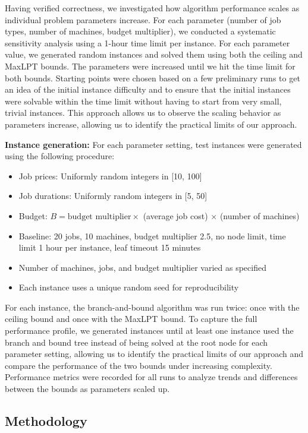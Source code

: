 Having verified correctness, we investigated how algorithm performance scales as individual problem parameters increase. 
For each parameter (number of job types, number of machines, budget multiplier), we conducted a systematic sensitivity analysis using a 1-hour time limit per instance. 
For each parameter value, we generated random instances and solved them using both the ceiling and MaxLPT bounds. The parameters were increased until we hit the time limit for both bounds.
Starting points were chosen based on a few preliminary runs to get an idea of the initial instance difficulty and to ensure that the initial instances were solvable within the time limit without having to start from very small, trivial instances. 
This approach allows us to observe the scaling behavior as parameters increase, allowing us to identify the practical limits of our approach.

\textbf{Instance generation:} For each parameter setting, test instances were generated using the following procedure:
\begin{itemize}
    \item Job prices: Uniformly random integers in [10, 100]
    \item Job durations: Uniformly random integers in [5, 50]
    \item Budget: $B = \text{budget multiplier} \times$ (average job cost) $\times$ (number of machines)
    \item Baseline: 20 jobs, 10 machines, budget multiplier 2.5, no node limit, time limit 1 hour per instance, leaf timeout 15 minutes
    \item Number of machines, jobs, and budget multiplier varied as specified
    \item Each instance uses a unique random seed for reproducibility
\end{itemize}

For each instance, the branch-and-bound algorithm was run twice: once with the ceiling bound and once with the MaxLPT bound. To capture the full performance profile, we generated instances until at least one instance used the branch and bound tree instead of being solved at the root node for each parameter setting, allowing us to identify the practical limits of our approach and compare the performance of the two bounds under increasing complexity. Performance metrics were recorded for all runs to analyze trends and differences between the bounds as parameters scaled up.
\subsection{Methodology}

